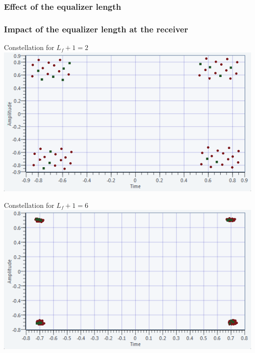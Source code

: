 \documentclass[11pt]{beamer}
\begin{document}
\subsubsection{Effect of the equalizer length}
\begin{frame}
\frametitle{Impact of the equalizer length at the receiver}
\begin{minipage}[c]{0.46\linewidth}
\centering 
{Constellation for $L_f + 1 = 2$}
\includegraphics[width=\textwidth]{img/ISI-2}
\end{minipage}
\begin{minipage}[c]{0.46\linewidth}
\centering 
{Constellation for $L_f + 1 = 6$}
\includegraphics[width=\textwidth]{img/ISI-6}
\end{minipage}
\end{frame}
\end{document}
